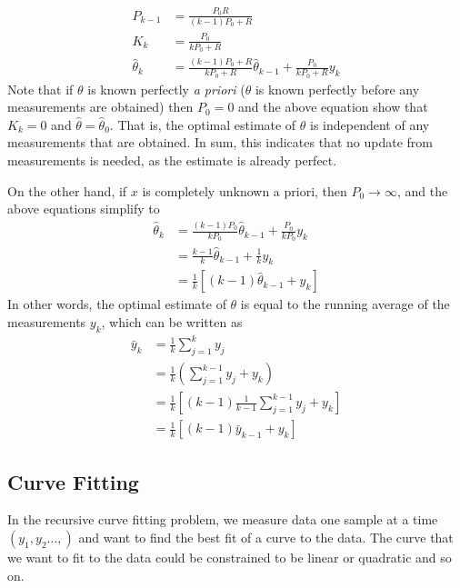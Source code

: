 \begin{align*}
	P_{k-1}&= \frac{P_0R}{(k-1)P_0+R}\\
	K_{k}&= \frac{P_0}{kP_0+R}\\
	\hat{\theta}_{k}&= \frac{(k-1)P_0+R}{kP_0+R}\hat{\theta}_{k-1}+\frac{P_0}{kP_0+R}y_k
\end{align*}
Note that if $\theta$ is known perfectly \textit{a priori} (\ie $\theta$ is known perfectly before any measurements are obtained) then $P_0 =0$ and the above equation show that $K_k=0$ and $\hat{\theta} = \hat{\theta}_0$. That is, the optimal estimate of $\theta$ is independent of any measurements that are obtained. In sum, this indicates that no update from measurements is needed, as the estimate is already perfect.

On the other hand, if $x$ is completely unknown a priori, then $P_0\to \infty$, and the above equations simplify to
\begin{align*}
\hat{\theta}_k &= \frac{(k-1)P_0}{kP_0} \hat{\theta}_{k-1} + \frac{P_0}{kP_0} y_k \\
         &= \frac{k-1}{k} \hat{\theta}_{k-1} + \frac{1}{k} y_k \\
         &= \frac{1}{k} [(k-1)\hat{\theta}_{k-1} + y_k]
\end{align*}
In other words, the optimal estimate of \(\theta\) is equal to the running average of the measurements \(y_k\), which can be written as
\begin{align*}
\bar{y}_k &= \frac{1}{k} \sum_{j=1}^k y_j \\
          &= \frac{1}{k} \left(\sum_{j=1}^{k-1} y_j + y_k\right) \\
          &= \frac{1}{k} \left[(k-1) \frac{1}{k-1} \sum_{j=1}^{k-1} y_j + y_k\right] \\
          &= \frac{1}{k} [(k-1) \bar{y}_{k-1} + y_k]
\end{align*}


\subsection{Curve Fitting} 
In the recursive curve fitting problem, we measure data one sample at a time $(y_1, y_2 \dots, )$ and want to find the best fit of a curve to the data. The curve that we want to fit to the data could be constrained to be linear or quadratic and so on. 

